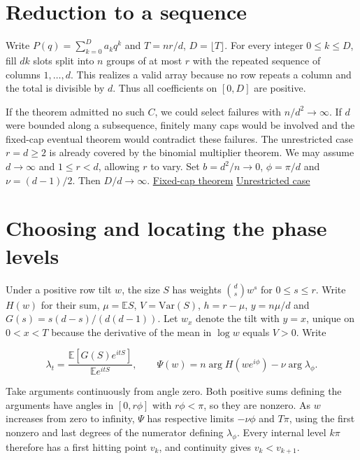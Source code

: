 \section{Reduction to a sequence}

Write $P(q)=\sum_{k=0}^D a_kq^k$ and $T=nr/d$, $D=\lfloor T\rfloor$. For every integer $0\le k\le D$, fill $dk$ slots split into $n$ groups of at most $r$ with the repeated sequence of columns $1,\ldots,d$. This realizes a valid array because no row repeats a column and the total is divisible by $d$. Thus all coefficients on $[0,D]$ are positive.

If the theorem admitted no such $C$, we could select failures with $n/d^2\to\infty$. If $d$ were bounded along a subsequence, finitely many caps would be involved and the fixed-cap eventual theorem would contradict these failures. The unrestricted case $r=d\ge2$ is already covered by the binomial multiplier theorem. We may assume $d\to\infty$ and $1\le r<d$, allowing $r$ to vary. Set $b=d^2/n\to0$, $\phi=\pi/d$ and $\nu=(d-1)/2$. Then $D/d\to\infty$. \href{https://github.com/ProgramComputer/open-math-research/tree/f7e10f84dd21fec44ca58c60bae0879d12ebd89b/topics/balanced-arrays/fixed-cap}{Fixed-cap theorem} \enspace \href{https://github.com/ProgramComputer/open-math-research/blob/04564a728c21eab6ce511b98a48ccaac754648ff/topics/balanced-arrays/finite-linear-reduction.md}{Unrestricted case}

\section{Choosing and locating the phase levels}

Under a positive row tilt $w$, the size $S$ has weights $\binom ds w^s$ for $0\le s\le r$. Write $H(w)$ for their sum, $\mu=\mathbb ES$, $V=\mathrm{Var}(S)$, $h=r-\mu$, $y=n\mu/d$ and $G(s)=s(d-s)/(d(d-1))$. Let $w_x$ denote the tilt with $y=x$, unique on $0<x<T$ because the derivative of the mean in $\log w$ equals $V>0$. Write

\begin{equation*}
\lambda_t=\frac{\mathbb E[G(S)e^{itS}]}{\mathbb E e^{itS}},
\qquad \Psi(w)=n\arg H(we^{i\phi})-\nu\arg\lambda_\phi .
\end{equation*}

Take arguments continuously from angle zero. Both positive sums defining the arguments have angles in $[0,r\phi]$ with $r\phi<\pi$, so they are nonzero. As $w$ increases from zero to infinity, $\Psi$ has respective limits $-\nu\phi$ and $T\pi$, using the first nonzero and last degrees of the numerator defining $\lambda_\phi$. Every internal level $k\pi$ therefore has a first hitting point $v_k$, and continuity gives $v_k<v_{k+1}$.

